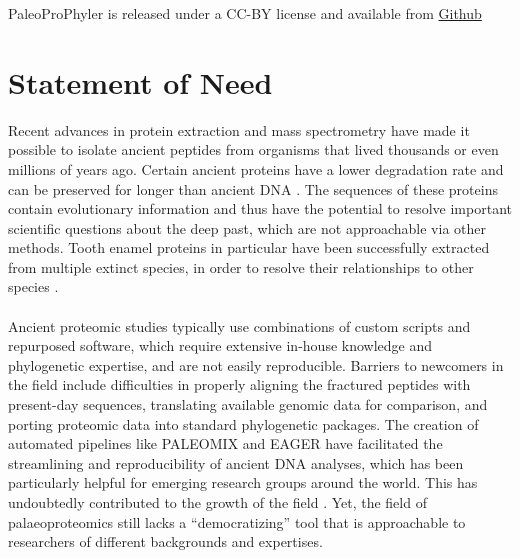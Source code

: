 \documentclass[twocolumn,showpacs,%
  nofootinbib,aps,superscriptaddress,%
  eqsecnum,prd,notitlepage,showkeys,10pt]{report}
\begin{document}
PaleoProPhyler is released under a CC-BY license and available from \href{https://github.com/johnpatramanis/Proteomic\_Pipeline}{Github}

\section{Statement of Need}

Recent advances in protein extraction and mass spectrometry \cite{ruther2022spin,lanigan2020multi,porto2011new}  have made it possible to isolate ancient peptides from organisms that lived thousands or even millions of years ago. Certain ancient proteins have a lower degradation rate and can be preserved for longer than ancient DNA \cite{cappellini2014unlocking, demarchi2016protein, hendy2021ancient, warinner2022_paleoproteomics}. The sequences of these proteins contain evolutionary information and thus have the potential to resolve important scientific questions about the deep past, which are not approachable via other methods. Tooth enamel proteins in particular have been successfully extracted from multiple extinct species, in order to resolve their relationships to other species \cite{welker2017middle,cappellini2019early,welker2019enamel,welker2020dental,buckley2015ancient,buckley2019collagen}.

\paragraph{}

Ancient proteomic studies typically use combinations of custom scripts and repurposed software, which require extensive in-house knowledge and phylogenetic expertise, and are not easily reproducible. Barriers to newcomers in the field include difficulties in properly aligning the fractured peptides with present-day sequences, translating available genomic data for comparison, and porting proteomic data into standard phylogenetic packages. The creation of automated pipelines like PALEOMIX \cite{schubert2014characterization} and EAGER \cite{peltzer2016eager} have facilitated the streamlining and reproducibility of ancient DNA analyses, which has been particularly helpful for emerging research groups around the world. This has undoubtedly contributed to the growth of the field \cite{lan2018technical}. Yet, the field of palaeoproteomics still lacks a “democratizing” tool that is approachable to researchers of different backgrounds and expertises.

\paragraph{}
\end{document}
